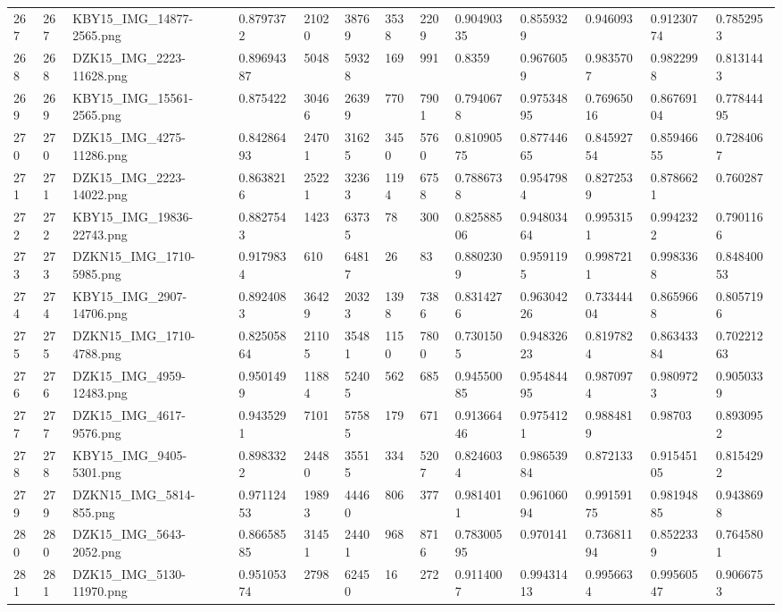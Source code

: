 \documentclass[11pt, a4paper, twoside]{report}
\begin{document}
\begin{longtable}[c]{@{}lllllllllllll@{}}
267 & 267 & KBY15\_IMG\_14877-2565.png & 0.8797372 & 21020 & 38769 & 3538 & 2209 & 0.90490335 & 0.8559329 & 0.946093 & 0.91230774 & 0.7852953 \\
268 & 268 & DZK15\_IMG\_2223-11628.png & 0.89694387 & 5048 & 59328 & 169 & 991 & 0.8359 & 0.9676059 & 0.9835707 & 0.9822998 & 0.8131443 \\
269 & 269 & KBY15\_IMG\_15561-2565.png & 0.875422 & 30466 & 26399 & 770 & 7901 & 0.7940678 & 0.97534895 & 0.76965016 & 0.86769104 & 0.77844495 \\
270 & 270 & DZK15\_IMG\_4275-11286.png & 0.84286493 & 24701 & 31625 & 3450 & 5760 & 0.81090575 & 0.87744665 & 0.84592754 & 0.85946655 & 0.7284067 \\
271 & 271 & DZK15\_IMG\_2223-14022.png & 0.8638216 & 25221 & 32363 & 1194 & 6758 & 0.7886738 & 0.9547984 & 0.8272539 & 0.8786621 & 0.760287 \\
272 & 272 & KBY15\_IMG\_19836-22743.png & 0.8827543 & 1423 & 63735 & 78 & 300 & 0.82588506 & 0.94803464 & 0.9953151 & 0.9942322 & 0.7901166 \\
273 & 273 & DZKN15\_IMG\_1710-5985.png & 0.9179834 & 610 & 64817 & 26 & 83 & 0.8802309 & 0.9591195 & 0.9987211 & 0.9983368 & 0.84840053 \\
274 & 274 & KBY15\_IMG\_2907-14706.png & 0.8924083 & 36429 & 20323 & 1398 & 7386 & 0.8314276 & 0.96304226 & 0.73344404 & 0.8659668 & 0.8057196 \\
275 & 275 & DZKN15\_IMG\_1710-4788.png & 0.82505864 & 21105 & 35481 & 1150 & 7800 & 0.7301505 & 0.94832623 & 0.8197824 & 0.86343384 & 0.70221263 \\
276 & 276 & DZK15\_IMG\_4959-12483.png & 0.9501499 & 11884 & 52405 & 562 & 685 & 0.94550085 & 0.95484495 & 0.9870974 & 0.9809723 & 0.9050339 \\
277 & 277 & DZK15\_IMG\_4617-9576.png & 0.9435291 & 7101 & 57585 & 179 & 671 & 0.91366446 & 0.9754121 & 0.9884819 & 0.98703 & 0.8930952 \\
278 & 278 & KBY15\_IMG\_9405-5301.png & 0.8983322 & 24480 & 35515 & 334 & 5207 & 0.8246034 & 0.98653984 & 0.872133 & 0.91545105 & 0.8154292 \\
279 & 279 & DZKN15\_IMG\_5814-855.png & 0.97112453 & 19893 & 44460 & 806 & 377 & 0.9814011 & 0.96106094 & 0.99159175 & 0.98194885 & 0.9438698 \\
280 & 280 & DZK15\_IMG\_5643-2052.png & 0.86658585 & 31451 & 24401 & 968 & 8716 & 0.78300595 & 0.970141 & 0.73681194 & 0.8522339 & 0.7645801 \\
281 & 281 & DZK15\_IMG\_5130-11970.png & 0.95105374 & 2798 & 62450 & 16 & 272 & 0.9114007 & 0.99431413 & 0.9956634 & 0.99560547 & 0.9066753 \\

\end{longtable}
\end{document}
